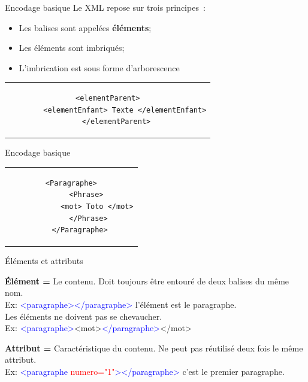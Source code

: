 \begin{frame}[fragile]{Encodage basique}
Le XML repose sur trois principes~:
\begin{itemize}
    \item Les balises sont appelées \textbf{éléments};
    \item Les éléments sont imbriqués;
    \item L'imbrication est sous forme d'arborescence
\end{itemize}
\vspace{1em}

\begin{tabular}{c}
    \begin{lstlisting}[numbers=none]
    <elementParent>
        <elementEnfant> Texte </elementEnfant>
    </elementParent>
    \end{lstlisting}
\end{tabular}

\end{frame}

\begin{frame}[fragile]{Encodage basique}
\begin{center}
    \begin{tabular}{c}
    \begin{lstlisting}[numbers=none]
    <Paragraphe>
        <Phrase> 
            <mot> Toto </mot>
        </Phrase>
    </Paragraphe>
    \end{lstlisting}
\end{tabular}
\end{center}
    
\end{frame}

\begin{frame}{Éléments et attributs}
\begin{block}{}
    \textbf{Élément =} Le contenu. Doit toujours être entouré de deux balises du même nom.\\
    Ex: \textcolor{blue}{<paragraphe></paragraphe>} \textrightarrow{} l'élément est le paragraphe.\\

    Les éléments ne doivent pas se chevaucher.\\
    Ex: \textcolor{blue}{<paragraphe>}\textcolor{BurntOrange}{<mot>}\textcolor{blue}{</paragraphe>}\textcolor{BurntOrange}{</mot>}
\end{block}

\begin{block}{}
    \textbf{Attribut =} Caractéristique du contenu. Ne peut pas réutilisé deux fois le même attribut.\\ 
    Ex: \textcolor{blue}{<paragraphe} \textcolor{red}{numero="1"}\textcolor{blue}{></paragraphe>} \textrightarrow{} c'est le premier paragraphe.
\end{block}
    
\end{frame}

